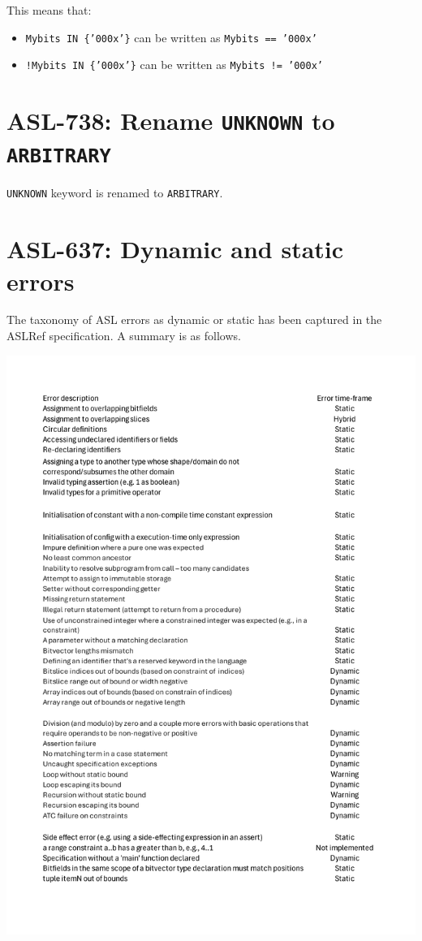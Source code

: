 This means that:
\begin{itemize}
\item \texttt{Mybits IN \{'000x'\}} can be written as \texttt{Mybits == '000x'}
\item \texttt{!Mybits IN \{'000x'\}} can be written as \texttt{Mybits != '000x'}
\end{itemize}

\section{ASL-738: Rename \texttt{UNKNOWN} to \texttt{ARBITRARY}}

\texttt{UNKNOWN} keyword is renamed to \texttt{ARBITRARY}.


\section{ASL-637: Dynamic and static errors}

The taxonomy of ASL errors as dynamic or static has been captured in the ASLRef
specification. A summary is as follows.

\includegraphics[width=\textwidth]{ASL-error-status.pdf}

